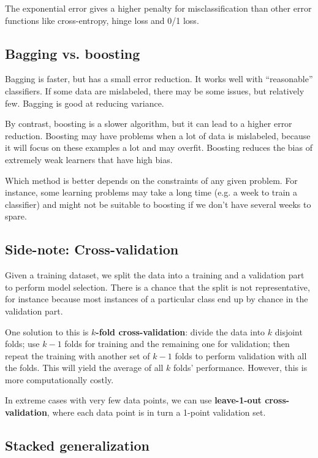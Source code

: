 \documentclass[a4paper,12pt]{article}
\begin{document}
The exponential error gives a higher penalty for misclassification than other error functions like cross-entropy, hinge loss and 0/1 loss. 

\subsection{Bagging vs. boosting}

Bagging is faster, but has a small error reduction. It works well with ``reasonable'' classifiers. If some data are mislabeled, there may be some issues, but relatively few. Bagging is good at reducing variance. 

By contrast, boosting is a slower algorithm, but it can lead to a higher error reduction. Boosting may have problems when a lot of data is mislabeled, because it will focus on these examples a lot and may overfit. Boosting reduces the bias of extremely weak learners that have high bias. 

Which method is better depends on the constraints of any given problem. For instance, some learning problems may take a long time (e.g. a week to train a classifier) and might not be suitable to boosting if we don't have several weeks to spare. 

\subsection{Side-note: Cross-validation}

Given a training dataset, we split the data into a training and a validation part to perform model selection. There is a chance that the split is not representative, for instance because most instances of a particular class end up by chance in the validation part. 

One solution to this is \textbf{$k$-fold cross-validation}: divide the data into $k$ disjoint folds; use $k-1$ folds for training and the remaining one for validation; then repeat the training with another set of $k-1$ folds to perform validation with all the folds. This will yield the average of all $k$ folds' performance. However, this is more computationally costly. 

In extreme cases with very few data points, we can use \textbf{leave-1-out cross-validation}, where each data point is in turn a 1-point validation set. 

\subsection{Stacked generalization}
\end{document}
